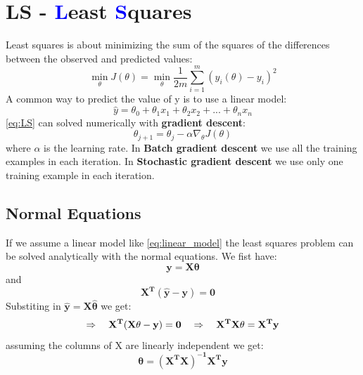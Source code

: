 \section{LS - \textcolor{blue}{L}east \textcolor{blue}{S}quares}
Least squares is about minimizing the sum of the squares of the differences between the observed and predicted values:
\begin{equation}
\min_{\theta} J(\theta) = \min_{\theta} \frac{1}{2m}\sum_{i=1}^{m} (\hat{y}_i(\theta)-y_i)^2
\label{eq:LS}
\end{equation}
A common way to predict the value of y is to use a linear model:
\begin{equation}
\hat{y} = \theta_0 + \theta_1x_1 + \theta_2x_2 + ... + \theta_nx_n
\label{eq:linear_model}
\end{equation}
\ref*{eq:LS} can solved numerically with \textbf{gradient descent}:
\begin{equation}
\theta_{j+1} = \theta_j - \alpha \nabla_{\theta} J(\theta)
\end{equation}
where $\alpha$ is the learning rate. \newline
In \textbf{Batch gradient descent} we use all the training examples in each iteration. In \textbf{Stochastic gradient descent} we use only one training example in each iteration.
\subsection*{Normal Equations}
If we assume a linear model like \ref{eq:linear_model} the least squares problem can be solved analytically with the normal equations. We fist have:
\begin{equation}
    \mathbf{
        y = X \theta}
\end{equation}
and
\begin{equation}
    \mathbf{
        X^T(\hat{y} - y) = 0 \quad
    }
\end{equation}
Substiting in $ \mathbf{\hat{y} = X \hat{\theta}} $ we get:
\begin{equation}
    \mathbf{
         \Rightarrow \quad X^T(X\theta - y) = 0 \quad \Rightarrow \quad X^TX\theta = X^Ty \newline
    }
\end{equation}
assuming the columns of X are linearly independent we get:
\begin{equation}
    \mathbf{
    \theta = (X^TX)^{-1}X^Ty
    }
    \label{eq:normal_equations}
\end{equation}

